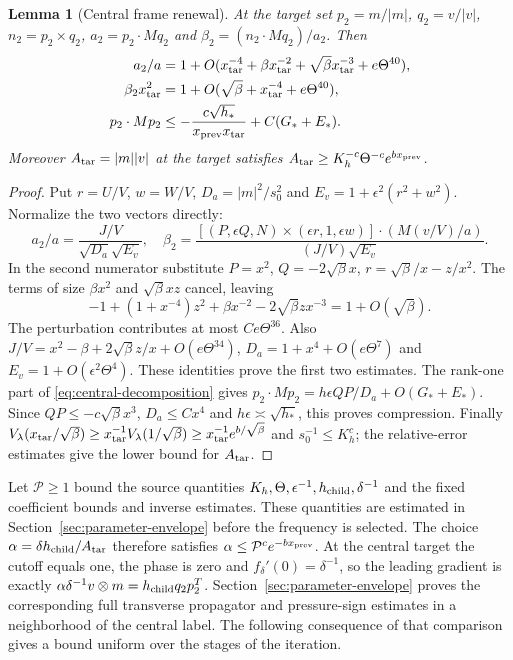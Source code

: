 \documentclass[11pt]{article}
\newtheorem{lemma}[theorem]{Lemma}
\theoremstyle{definition}
\begin{document}
\begin{lemma}[Central frame renewal]\label{lem:central-renewal}
At the target set $p_2=m/|m|$, $q_2=v/|v|$, $n_2=p_2\times q_2$,
$a_2=p_2\cdot Mq_2$ and $\beta_2=(n_2\cdot Mq_2)/a_2$. Then
\begin{align*}
 a_2/a&=1+O(x_{\rm tar}^{-4}+\beta x_{\rm tar}^{-2}
       +\sqrt\beta x_{\rm tar}^{-3}+e\Theta^{40}),\\
 \beta_2x_{\rm tar}^2&=1+O(\sqrt\beta+x_{\rm tar}^{-4}+e\Theta^{40}),\\
 p_2\cdot Mp_2&\leq-\frac{c\sqrt{h_*}}{x_{\rm prev}x_{\rm tar}}
                                     +C(G_*+E_*).
\end{align*}
Moreover $A_{\rm tar}=|m||v|$ at the target satisfies
$A_{\rm tar}\geq K_h^{-c}\Theta^{-c}e^{b x_{\rm prev}}$.
\end{lemma}
\begin{proof}
Put $r=U/V$, $w=W/V$, $D_a=|m|^2/s_0^2$ and
$E_v=1+\epsilon^2(r^2+w^2)$. Normalize the two vectors directly:
\[
 a_2/a=\frac{J/V}{\sqrt{D_a}\sqrt{E_v}},\quad
 \beta_2=\frac{[(P,\epsilon Q,N)\times(\epsilon r,1,\epsilon w)]
                    \cdot(M(v/V)/a)}{(J/V)\sqrt{E_v}}.
\]
In the second numerator substitute
$P=x^2$, $Q=-2\sqrt\beta x$, $r=\sqrt\beta/x-z/x^2$.
The terms of size $\beta x^2$ and $\sqrt\beta xz$ cancel, leaving
\[
 -1+(1+x^{-4})z^2+\beta x^{-2}-2\sqrt\beta z x^{-3}
       =1+O(\sqrt\beta).
\]
The perturbation contributes at most $Ce\Theta^{36}$.
Also $J/V=x^2-\beta+2\sqrt\beta z/x+O(e\Theta^{34})$,
$D_a=1+x^4+O(e\Theta^7)$ and $E_v=1+O(\epsilon^2\Theta^4)$.
These identities prove the first two estimates. The rank-one part of
\eqref{eq:central-decomposition} gives
$p_2\cdot Mp_2=h\epsilon QP/D_a+O(G_*+E_*)$.
Since $QP\leq-c\sqrt\beta x^3$, $D_a\leq Cx^4$ and
$h\epsilon\asymp\sqrt{h_*}$, this proves compression.
Finally $V_\lambda(x_{\rm tar}/\sqrt\beta)\geq x_{\rm tar}^{-1}
V_\lambda(1/\sqrt\beta)\geq x_{\rm tar}^{-1}e^{b/\sqrt\beta}$ and
$s_0^{-1}\leq K_h^c$; the relative-error estimates give the lower bound
for $A_{\rm tar}$.
\end{proof}

Let $\mathcal P\geq1$ bound the source quantities
$K_h,\Theta,\epsilon^{-1},h_{\rm child},\delta^{-1}$ and the fixed
coefficient bounds and inverse estimates. These quantities are estimated in
Section~\ref{sec:parameter-envelope} before the frequency is selected.
The choice $\alpha=\delta h_{\rm child}/A_{\rm tar}$ therefore satisfies
$\alpha\leq\mathcal P^c e^{-b x_{\rm prev}}$.
At the central target the cutoff equals one, the phase is zero and
$f_\delta'(0)=\delta^{-1}$, so the leading gradient is exactly
$\alpha\delta^{-1}v\otimes m=h_{\rm child}q_2p_2^T$.
Section~\ref{sec:parameter-envelope} proves the corresponding full
transverse propagator and pressure-sign estimates in a neighborhood of
the central label. The following consequence of that comparison gives
a bound uniform over the stages of the iteration.
\end{document}
